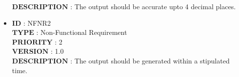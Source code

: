 \documentclass[a4paper,10pt]{report}
\begin{document}
\begin{itemize}
   $\textbf{DESCRIPTION}$\hspace{0.1cm} : The output should be accurate upto 4 decimal places.
\\[1cm]
\item $\textbf{ID}$\hspace{2.51cm}   : NFNR2\\
   $\textbf{TYPE}$\hspace{1.85cm}   : Non-Functional Requirement\\
   $\textbf{PRIORITY}$\hspace{0.9cm} : 2\\
   $\textbf{VERSION}$\hspace{1.10cm} : 1.0\\
   $\textbf{DESCRIPTION}$\hspace{0.1cm} : The output should be generated within a stipulated time.
\\[1cm]
\end{itemize}
\end{document}

